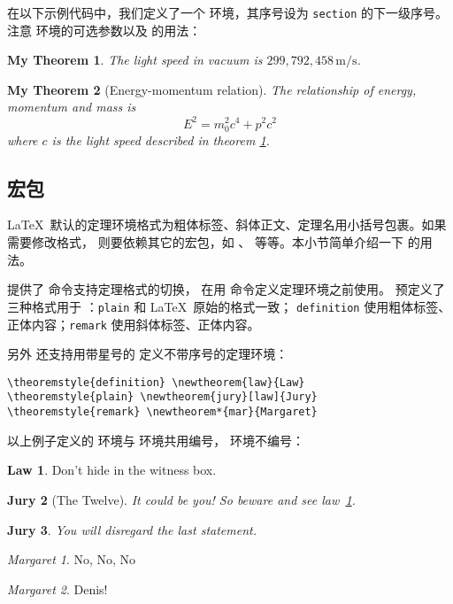 在以下示例代码中，我们定义了一个  环境，其序号设为 \texttt{section} 的下一级序号。
注意  环境的可选参数以及  的用法：
\begin{example}
\newtheorem{mythm}{My Theorem}[section]
\begin{mythm}\label{thm:light}
The light speed in vacuum
is $299,792,458\,\mathrm{m/s}$.
\end{mythm}
\begin{mythm}[Energy-momentum relation]
The relationship of energy, 
momentum and mass is 
\[E^2 = m_0^2 c^4 + p^2 c^2\]
where $c$ is the light speed 
described in theorem \ref{thm:light}.
\end{mythm}
\end{example}

\subsection{ 宏包}\label{subsec:amsthm}

\LaTeX\ 默认的定理环境格式为粗体标签、斜体正文、定理名用小括号包裹。如果需要修改格式，
则要依赖其它的宏包，如 、 等等。本小节简单介绍一下  的用法。

 提供了  命令支持定理格式的切换，
在用  命令定义定理环境之前使用。
 预定义了三种格式用于 ：\texttt{plain} 和 \LaTeX\ 原始的格式一致；
\texttt{defi\-ni\-tion} 使用粗体标签、正体内容；\texttt{remark} 使用斜体标签、正体内容。

另外  还支持用带星号的  定义不带序号的定理环境：
\begin{verbatim}
\theoremstyle{definition} \newtheorem{law}{Law}
\theoremstyle{plain} \newtheorem{jury}[law]{Jury}
\theoremstyle{remark} \newtheorem*{mar}{Margaret}
\end{verbatim}
\theoremstyle{definition} \newtheorem{law}{Law}
\theoremstyle{plain} \newtheorem{jury}[law]{Jury}
\theoremstyle{remark} \newtheorem*{mar}{Margaret}

以上例子定义的  环境与  环境共用编号， 环境不编号：
\begin{example}
\begin{law}\label{law:box}
Don't hide in the witness box.
\end{law}
\begin{jury}[The Twelve]
It could be you! So beware and
see law~\ref{law:box}.\end{jury}
\begin{jury}
You will disregard the last
statement.\end{jury}
\begin{mar}No, No, No\end{mar}
\begin{mar}Denis!\end{mar}
\end{example}

